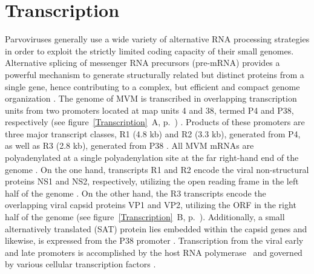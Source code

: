 \section{Transcription}
Parvoviruses generally use a wide variety of alternative RNA processing strategies in order to exploit the strictly limited coding capacity of their small genomes. Alternative splicing of messenger RNA precursors (pre-mRNA) provides a powerful mechanism to generate structurally related but distinct proteins from a single gene, hence contributing to a complex, but efficient and compact genome organization \cite{pmid2694943, pmid1335742}. The genome of MVM is transcribed in overlapping transcription units from two promoters located at map units 4 and 38, termed P4 and P38, respectively (see figure~\ref{Transcription}~A, p.~\pageref{Transcription}) \cite{pmid6828378}. Products of these promoters are three major transcript classes, R1 (4.8 kb) and R2 (3.3 kb), generated from P4, as well as R3 (2.8 kb), generated from P38 \cite{pmid3951017}. All MVM mRNAs are polyadenylated at a single polyadenylation site at the far right-hand end of the genome \cite{pmid3660591, pmid3502703}. On the one hand, transcripts R1 and R2 encode the viral non-structural proteins NS1 and NS2, respectively, utilizing the open reading frame in the left half of the genome \cite{pmid2939261}. On the other hand, the R3 transcripts encode the overlapping viral capsid proteins VP1 and VP2, utilizing the ORF in the right half of the genome (see figure~\ref{Transcription}~B, p.~\pageref{Transcription}). Additionally, a small alternatively translated (SAT) protein lies embedded within the capsid genes and likewise, is expressed from the P38 promoter \cite{pmid16189014}. Transcription from the viral early and late promoters is accomplished by the host RNA polymerase~ \cite{pmid6828378, polII} and governed by various cellular transcription factors \cite{pmid2585609, pmid8009857, pmid2325201, pmid7983715, pmid1942250}. 

